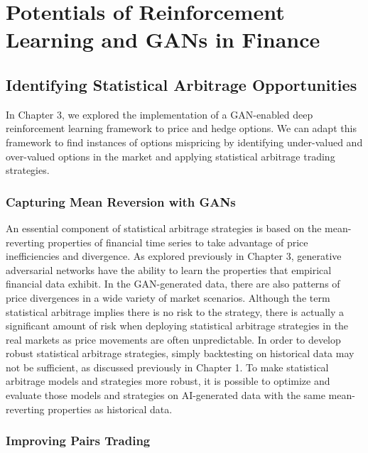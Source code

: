 \chapter{Potentials of Reinforcement Learning and GANs in Finance}

\section{Identifying Statistical Arbitrage Opportunities}

In Chapter 3, we explored the implementation of a GAN-enabled deep reinforcement learning framework to price and hedge options. We can adapt this framework to find instances of options mispricing by identifying under-valued and over-valued options in the market and applying statistical arbitrage trading strategies.

\subsection{Capturing Mean Reversion with GANs}
An essential component of statistical arbitrage strategies is based on the mean-reverting properties of financial time series to take advantage of price inefficiencies and divergence. As explored previously in Chapter 3, generative adversarial networks have the ability to learn the properties that empirical financial data exhibit. In the GAN-generated data, there are also patterns of price divergences in a wide variety of market scenarios. Although the term statistical arbitrage implies there is no risk to the strategy, there is actually a significant amount of risk when deploying statistical arbitrage strategies in the real markets as price movements are often unpredictable. In order to develop robust statistical arbitrage strategies, simply backtesting on historical data may not be sufficient, as discussed previously in Chapter 1. To make statistical arbitrage models and strategies more robust, it is possible to optimize and evaluate those models and strategies on AI-generated data with the same mean-reverting properties as historical data.

\subsection{Improving Pairs Trading}

